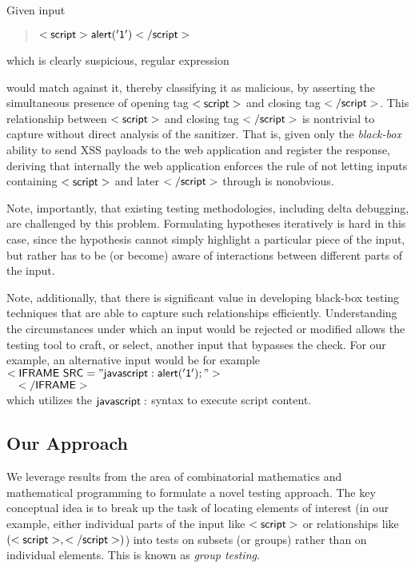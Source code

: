 Given input 
\begin{quote}
$\sf{<script>alert('1')</script>}$
\end{quote}
which is clearly suspicious, regular expression
\begin{quote}
\end{quote}
would match against it, thereby classifying it as malicious, by asserting the simultaneous presence of opening tag ${\sf <script>}$ and closing tag ${\sf </script>}$. This relationship between ${\sf <script>}$ and closing tag ${\sf </script>}$ is nontrivial to capture without direct analysis of the sanitizer. That is, given only the \emph{black-box} ability to send XSS payloads to the web application and register the response, deriving that internally the web application enforces the rule of not letting inputs containing ${\sf <script>}$ and later ${\sf </script>}$ through is nonobvious.

Note, importantly, that existing testing methodologies, including delta debugging, are challenged by this problem. Formulating hypotheses iteratively is hard in this case, since the hypothesis cannot simply highlight a particular piece of the input, but rather has to be (or become) aware of interactions between different parts of the input.

Note, additionally, that there is significant value in developing black-box testing techniques that are able to capture such relationships efficiently. Understanding the circumstances under which an input would be rejected or modified allows the testing tool to craft, or select, another input that bypasses the check. For our example, an alternative input would be for example\\
	${\sf <IFRAME~SRC="javascript:alert('1');">}$\\${\quad\sf </IFRAME>}$\\
which utilizes the ${\sf javascript:}$ syntax to execute script content.

\subsection{Our Approach} We leverage results from the area of combinatorial mathematics and mathematical programming to formulate a novel testing approach. The key conceptual idea is to break up the task of locating elements of interest (in our example, either individual parts of the input like ${\sf <script>}$ or relationships like ${\sf (<script>, </script>)}$) into tests on subsets (or groups) rather than on individual elements. This is known as \emph{group testing}.

